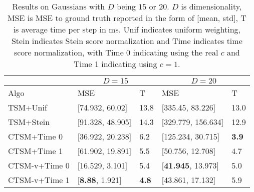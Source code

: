 \begin{table*}
        \begin{center}
        \caption{Results on Gaussians with $D$ being $15$ or $20$. $D$ is dimensionality, MSE is MSE to ground truth reported in the form of [mean, std], T is average time per step in ms. Unif indicates uniform weighting, Stein indicates Stein score normalization and Time indicates time score normalization, with Time 0 indicating using the real $c$ and Time 1 indicating using $c=1$.}
                \begin{tabular}{|l|l|l|l|l|}
                        \hline
                        & \multicolumn{2}{|c|}{$D=15$} & \multicolumn{2}{|c|}{$D=20$} \\
                        \hline
                        Algo & MSE & T & MSE & T \\
                        \hline
                        TSM+Unif & [74.932, 60.02] & 13.8 & [335.45, 83.226] & 13.0 \\
                        \hline
                        TSM+Stein & [91.328, 48.905] & 14.3 & [329.779, 156.634] & 12.9 \\
                        \hline
                        CTSM+Time 0 & [36.922, 20.238] & 6.2 & [125.234, 30.715] & \textbf{3.9} \\
                        \hline
                        CTSM+Time 1 & [61.902, 19.891] & 5.5 & [50.756, 12.708] & 4.7 \\
                        \hline
                        CTSM-v+Time 0 & [16.529, 3.101] & 5.4 & [\textbf{41.945}, 13.973] & 5.0 \\
                        \hline
                        CTSM-v+Time 1 & [\textbf{8.88}, 1.921] & \textbf{4.8} & [43.861, 17.132] & 5.9 \\
                        \hline
                \end{tabular}
        \label{tbl:gaussians2}
        \end{center}
\end{table*}

